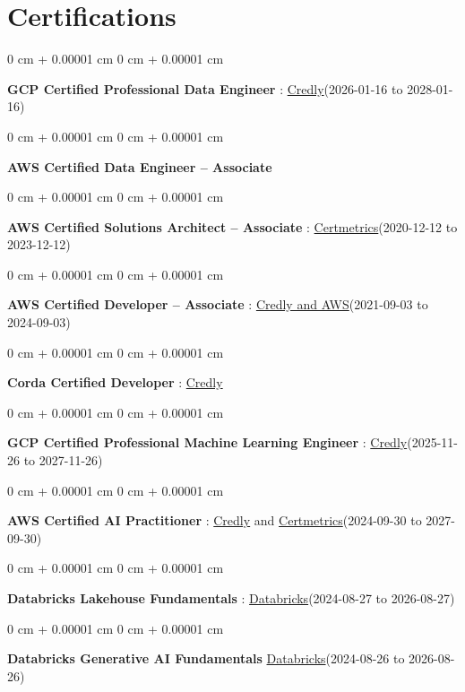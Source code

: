 \documentclass[10pt, letterpaper]{article}
\newenvironment{onecolentry}{
    \begin{adjustwidth}{
        0 cm + 0.00001 cm
    }{
        0 cm + 0.00001 cm
    }
}{
    \end{adjustwidth}
} %
\begin{document}
    \vspace{2 pt }
    \section{Certifications}
        \vspace{2 pt }
        \begin{samepage}
            \begin{onecolentry}
                \textbf{GCP Certified Professional Data Engineer} : \href{https://www.credly.com/badges/977e96d9-12e7-4f6c-b8a7-df71fb7153b8/public_url}{Credly}(2026-01-16 to 2028-01-16)
            \end{onecolentry}
            \begin{onecolentry}
                \textbf{AWS Certified Data Engineer – Associate}
            \end{onecolentry}
            \begin{onecolentry}
                \textbf{AWS Certified Solutions Architect – Associate} : \href{https://cp.certmetrics.com/amazon/en/public/verify/credential/SNBY48EBJJVE1SWX}{Certmetrics}(2020-12-12 to 2023-12-12)
            \end{onecolentry}
            \begin{onecolentry}
                \textbf{AWS Certified Developer – Associate} : \href{https://www.credly.com/badges/b8106fbd-d3d1-4204-8cdf-e708798fd582/public_url}{Credly and AWS}(2021-09-03  to 2024-09-03)
            \end{onecolentry}
            \begin{onecolentry}
                \textbf{Corda Certified Developer} : \href{https://www.credly.com/badges/7f29d39c-34b6-4de9-b07d-e10f1090a335/linked_in_profile}{Credly}
            \end{onecolentry}
            \begin{onecolentry}
                \textbf{GCP Certified Professional Machine Learning Engineer} : \href{https://www.credly.com/badges/a6965347-09ea-4d8f-b398-0e151407160d/public_url}{Credly}(2025-11-26 to 2027-11-26)
            \end{onecolentry}
            \begin{onecolentry}
                \textbf{AWS Certified AI Practitioner} : \href{https://www.credly.com/badges/451b7ba5-8be1-4a8e-bbec-ade26627a6b6/public_url}{Credly} and \href{https://cp.certmetrics.com/amazon/en/public/verify/credential/495f0d9853874bf9a33c17f8e89ce131}{Certmetrics}(2024-09-30 to 2027-09-30)
            \end{onecolentry}
            \begin{onecolentry}
                \textbf{Databricks Lakehouse Fundamentals} : \href{https://scl.io/FXGKS0u}{Databricks}(2024-08-27 to 2026-08-27)
            \end{onecolentry}
            \begin{onecolentry}
                \textbf{Databricks Generative AI Fundamentals} \href{https://sgq.io/3uIFGNi}{Databricks}(2024-08-26 to 2026-08-26)
            \end{onecolentry}
        \end{samepage}
\end{document}
